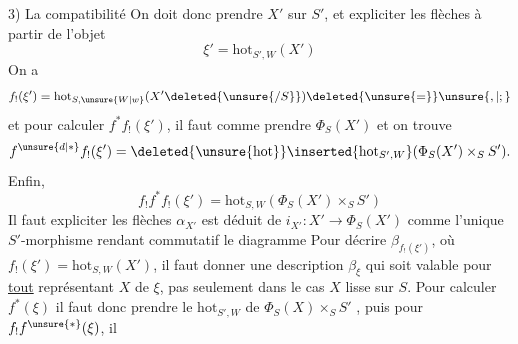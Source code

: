 3) La compatibilité
On doit donc prendre $X'$ sur $S'$, et  expliciter les flèches à partir de l'objet
\[
 \xi'=\mathrm{hot}_{S',W}(X')
\]
On a
\[
 f_!(\xi')=\mathrm{hot}_{S,\unsure{W|w}}(X'\deleted{\unsure{/S}})\deleted{\unsure{=}}\unsure{,|;}
\]
et pour calculer $f^*f_!(\xi')$, il faut comme  prendre $\Phi_S(X')$ et on trouve
\[
 f^{\unsure{d|*}}f_!(\xi')=\deleted{\unsure{\mathrm{hot}}}\inserted{\mathrm{hot}_{S',W}}(\Phi_S(X')\times_S S').
\]
Enfin,
\[
 f_!f^*f_!(\xi')=\mathrm{hot}_{S,W}(\Phi_S(X')\times_S S')
\]
Il faut expliciter les flèches
$\alpha_{X'}$ est déduit de $i_{X'}:X'\longrightarrow\Phi_S(X')$ comme l'unique $S'$-morphisme rendant commutatif le diagramme
Pour décrire $\beta_{f_!(\xi')}$, où $f_!(\xi')=\mathrm{hot}_{S,W}(X')$, il faut donner une description   $\beta_\xi$ qui soit valable pour \uline{tout} représentant $X$ de $\xi$, pas seulement dans le cas $X$ lisse sur $S$.  Pour calculer $f^*(\xi)$ il faut donc prendre le $\mathrm{hot}_{S',W}$ de $\Phi_S(X)\times_S S'$ , puis pour $f_!f^{\unsure{*}}(\xi)$, il
